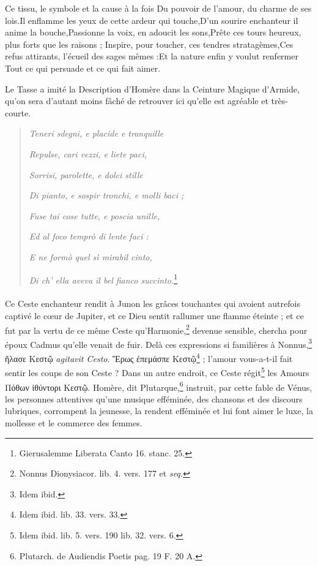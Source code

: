 \documentclass[a4paper, 18pt, oneside]{article}
\begin{document}
Ce tissu, le symbole et la cause à la fois Du pouvoir de l'amour, du charme de ses lois.Il enflamme les yeux de cette ardeur qui touche,D'un sourire enchanteur il anime la bouche,Passionne la voix, en adoucit les sons,Prête ces tours heureux, plus forts que les raisons ; Inspire, pour toucher, ces tendres stratagèmes,Ces refus attirants, l'écueil des sages mêmes :Et la nature enfin y voulut renfermer Tout ce qui persuade et ce qui fait aimer.

Le Tasse a imité la Description d'Homère dans la Ceinture Magique d'Armide, qu'on sera d'autant moins fâché de retrouver ici qu'elle est agréable et très-courte.
\begin{quotation}
\emph{Teneri sdegni, e placide e tranquille}

\emph{Repulse, cari vezzi, e liete paci,}

\emph{Sorrisi, parolette, e dolci stille}

\emph{Di pianto, e sospir tronchi, e molli baci ;}

\emph{Fuse tai cose tutte, e poscia unille,}

\emph{Ed al foco temprò di lente faci :}

\emph{E ne formò quel sì mirabil cinto,}

\emph{Di ch' ella aveva il bel fianco succinto.}\footnote{Gierusalemme Liberata Canto 16. stanc. 25.}
\end{quotation}
\paragraph{}
Ce Ceste enchanteur rendit à Junon les grâces touchantes qui avoient autrefois captivé le cœur de Jupiter, et ce Dieu sentit rallumer une flamme éteinte ; et ce fut par la vertu de ce même Ceste qu'Harmonie,\footnote{Nonnus Dionysiacor. lib. 4. vers. 177 et \emph{seq.}} devenue sensible, chercha pour époux Cadmus qu'elle venait de fuir. Delà ces expressions si familières à Nonnus,\footnote{Idem ibid.} ἤλασε Κεστῷ \emph{agitavit Cesto}. Ἔρως ἐπεμάσπε Κεστῷ\footnote{Idem ibid. lib. 33. vers. 33.} ; l'amour vous-a-t-il fait sentir les coups de son Ceste ? Dans un autre endroit, ce Ceste régit\footnote{Idem ibid. lib. 5. vers. 190 lib. 32. vers. 6.} les Amours Πόθων ἰθύντορι Κεστῷ. Homère, dit Plutarque,\footnote{Plutarch. de Audiendis Poetis pag. 19 F. 20 A.} instruit, par cette fable de Vénus, les personnes attentives qu'une musique efféminée, des chansons et des discours lubriques, corrompent la jeunesse, la rendent efféminée et lui font aimer le luxe, la mollesse et le commerce des femmes.
\end{document}
